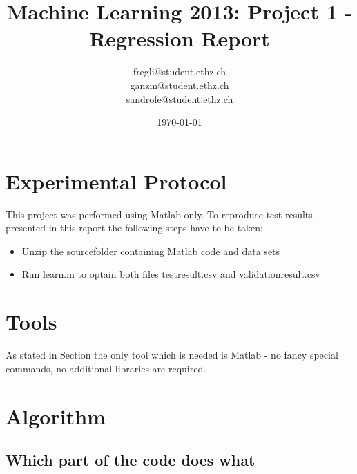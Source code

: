 \documentclass[a4paper, 11pt]{article}
\title{Machine Learning 2013: Project 1 - Regression Report}
\author{fregli@student.ethz.ch\\ ganzm@student.ethz.ch\\ sandrofe@student.ethz.ch\\}
\date{\today}
\begin{document}
\maketitle

\section*{Experimental Protocol}
\label{sec:exp-protocl}

This project was performed using Matlab only. To reproduce test results presented in this report the following steps have to be taken:

\begin{itemize}
\item Unzip the sourcefolder containing Matlab code and data sets
\item Run learn.m to optain both files testresult.csv and validationresult.csv
\end{itemize}

\section{Tools}

As stated in Section  the only tool which is needed is Matlab - no fancy special commands, no additional libraries are required.

\section{Algorithm}


\subsection{Which part of the code does what}
\end{document}
